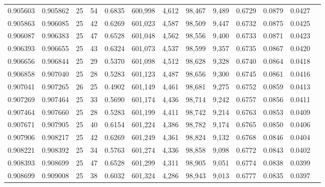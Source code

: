 \begin{tabular}{rrrrrrrrrrrrr}
0.905603 & 0.905862 &    25 &  54 &                                     0.6835 & 600,998 &   4,612 &  98,467 &   9,489 & 0.6729 & 0.0879 & 0.0427 \\
0.905863 & 0.906085 &    25 &  42 &                                     0.6269 & 601,023 &   4,587 &  98,509 &   9,447 & 0.6732 & 0.0875 & 0.0425 \\
0.906087 & 0.906383 &    25 &  47 &                                     0.6528 & 601,048 &   4,562 &  98,556 &   9,400 & 0.6733 & 0.0871 & 0.0423 \\
0.906393 & 0.906655 &    25 &  43 &                                     0.6324 & 601,073 &   4,537 &  98,599 &   9,357 & 0.6735 & 0.0867 & 0.0420 \\
0.906656 & 0.906844 &    25 &  29 &                                     0.5370 & 601,098 &   4,512 &  98,628 &   9,328 & 0.6740 & 0.0864 & 0.0418 \\
0.906858 & 0.907040 &    25 &  28 &                                     0.5283 & 601,123 &   4,487 &  98,656 &   9,300 & 0.6745 & 0.0861 & 0.0416 \\
0.907041 & 0.907265 &    26 &  25 &                                     0.4902 & 601,149 &   4,461 &  98,681 &   9,275 & 0.6752 & 0.0859 & 0.0413 \\
0.907269 & 0.907464 &    25 &  33 &                                     0.5690 & 601,174 &   4,436 &  98,714 &   9,242 & 0.6757 & 0.0856 & 0.0411 \\
0.907464 & 0.907660 &    25 &  28 &                                     0.5283 & 601,199 &   4,411 &  98,742 &   9,214 & 0.6763 & 0.0853 & 0.0409 \\
0.907671 & 0.907905 &    25 &  40 &                                     0.6154 & 601,224 &   4,386 &  98,782 &   9,174 & 0.6765 & 0.0850 & 0.0406 \\
0.907906 & 0.908217 &    25 &  42 &                                     0.6269 & 601,249 &   4,361 &  98,824 &   9,132 & 0.6768 & 0.0846 & 0.0404 \\
0.908221 & 0.908392 &    25 &  34 &                                     0.5763 & 601,274 &   4,336 &  98,858 &   9,098 & 0.6772 & 0.0843 & 0.0402 \\
0.908393 & 0.908699 &    25 &  47 &                                     0.6528 & 601,299 &   4,311 &  98,905 &   9,051 & 0.6774 & 0.0838 & 0.0399 \\
0.908699 & 0.909008 &    25 &  38 &                                     0.6032 & 601,324 &   4,286 &  98,943 &   9,013 & 0.6777 & 0.0835 & 0.0397 \\

\end{tabular}
